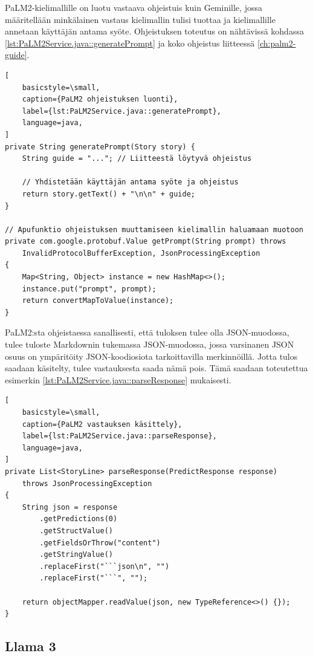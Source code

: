 PaLM2-kielimallille on luotu vastaava ohjeistuis kuin Geminille, jossa
määritellään minkälainen vastaus kielimallin tulisi tuottaa ja kielimallille
annetaan käyttäjän antama syöte. Ohjeistuksen toteutus on nähtävissä kohdassa
\ref{lst:PaLM2Service.java::generatePrompt} ja koko ohjeistus liitteessä \ref{ch:palm2-guide}.

\begin{lstlisting}[
    basicstyle=\small,
    caption={PaLM2 ohjeistuksen luonti},
    label={lst:PaLM2Service.java::generatePrompt},
    language=java,
]
private String generatePrompt(Story story) {
    String guide = "..."; // Liitteestä löytyvä ohjeistus

    // Yhdistetään käyttäjän antama syöte ja ohjeistus
    return story.getText() + "\n\n" + guide;
}

// Apufunktio ohjeistuksen muuttamiseen kielimallin haluamaan muotoon
private com.google.protobuf.Value getPrompt(String prompt) throws
    InvalidProtocolBufferException, JsonProcessingException
{
    Map<String, Object> instance = new HashMap<>();
    instance.put("prompt", prompt);
    return convertMapToValue(instance);
}
\end{lstlisting}

PaLM2:sta ohjeistaessa sanallisesti, että tuloksen tulee olla JSON-muodossa,
tulee tuloste Markdownin tukemassa JSON-muodossa, jossa varsinanen JSON osuus
on ympäritöity JSON-koodiosiota tarkoittavilla merkinnöillä. Jotta tulos
saadaan käsitelty, tulee vastauksesta saada nämä pois. Tämä saadaan toteutettua
esimerkin \ref{lst:PaLM2Service.java::parseResponse} mukaisesti.

\begin{lstlisting}[
    basicstyle=\small,
    caption={PaLM2 vastauksen käsittely},
    label={lst:PaLM2Service.java::parseResponse},
    language=java,
]
private List<StoryLine> parseResponse(PredictResponse response)
    throws JsonProcessingException
{
    String json = response
        .getPredictions(0)
        .getStructValue()
        .getFieldsOrThrow("content")
        .getStringValue()
        .replaceFirst("```json\n", "")
        .replaceFirst("```", "");

    return objectMapper.readValue(json, new TypeReference<>() {});
}
\end{lstlisting}

\subsection{Llama 3}

